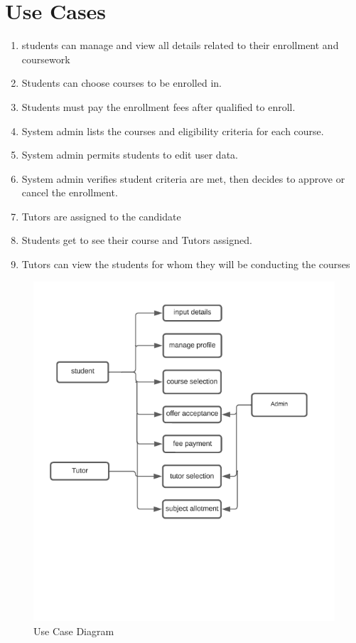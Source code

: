 \section{Use Cases}

\begin{enumerate}
  \item students can manage and view all details related to their enrollment and coursework   
  \item Students can choose courses to be enrolled in.
  \item Students must pay the enrollment fees after qualified to enroll.
  \item System admin lists the courses and eligibility criteria for each course.
  \item System admin permits students to edit user data.
  \item System admin verifies student  criteria are met, then decides to approve or cancel the enrollment.
  \item Tutors are assigned to the candidate
  \item Students get to see their course and Tutors assigned.
  \item Tutors can view the students for whom they will be conducting the courses
\end{enumerate}

\begin{figure}[hbt!]
    \includegraphics{1.png}
    \caption{Use Case Diagram}
\end{figure}







